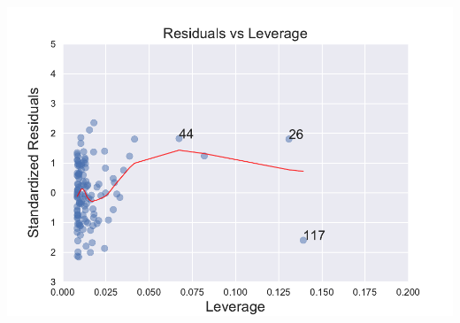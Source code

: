 \documentclass[]{book}
\begin{document}
\includegraphics{02-simplereg_files/figure-latex/unnamed-chunk-21-1.pdf}


\end{document}

